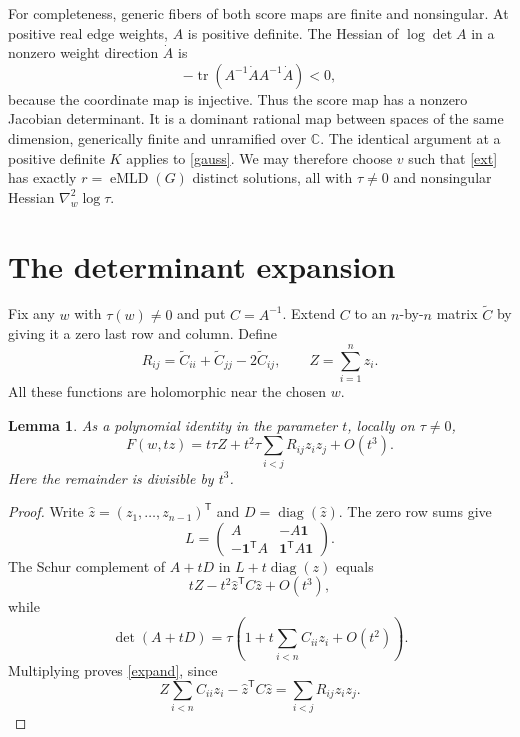 \documentclass[11pt]{article}
\newtheorem{lemma}{Lemma}
\newcommand{\CC}{\mathbb C}
\newcommand{\diag}{\operatorname{diag}}
\newcommand{\eMLD}{\operatorname{eMLD}}
\begin{document}
For completeness, generic fibers of both score maps are finite and
nonsingular. At positive real edge weights, $A$ is positive definite.
The Hessian of $\log\det A$ in a nonzero weight direction $\dot A$ is
\[
 -\operatorname{tr}(A^{-1}\dot A A^{-1}\dot A)<0,
\]
because the coordinate map is injective. Thus the score map has a
nonzero Jacobian determinant. It is a dominant rational map between
spaces of the same dimension, generically finite and unramified over
$\CC$. The identical argument at a positive definite $K$ applies to
\eqref{gauss}. We may therefore choose $v$ such that \eqref{ext} has
exactly $r=\eMLD(G)$ distinct solutions, all with $\tau\ne0$ and
nonsingular Hessian $\nabla_w^2\log\tau$.

\section*{The determinant expansion}
Fix any $w$ with $\tau(w)\ne0$ and put $C=A^{-1}$. Extend $C$ to an
$n$-by-$n$ matrix $\widetilde C$ by giving it a zero last row and column.
Define
\begin{equation}\label{resistance}
 R_{ij}=\widetilde C_{ii}+\widetilde C_{jj}-2\widetilde C_{ij},
 \qquad Z=\sum_{i=1}^n z_i.
\end{equation}
All these functions are holomorphic near the chosen $w$.
\begin{lemma}\label{expansion}
As a polynomial identity in the parameter $t$, locally on $\tau\ne0$,
\begin{equation}\label{expand}
 F(w,tz)=t\tau Z+
 t^2\tau\sum_{i<j}R_{ij}z_i z_j+O(t^3).
\end{equation}
Here the remainder is divisible by $t^3$.
\end{lemma}
\begin{proof}
Write $\widehat z=(z_1,\ldots,z_{n-1})^{\mathsf T}$ and
$D=\diag(\widehat z)$. The zero row sums give
\[
 L=\begin{pmatrix}A&-A\mathbf1\\-\mathbf1^{\mathsf T}A&
                  \mathbf1^{\mathsf T}A\mathbf1\end{pmatrix}.
\]
The Schur complement of $A+tD$ in $L+t\diag(z)$ equals
\[
 tZ-t^2\widehat z^{\mathsf T}C\widehat z+O(t^3),
\]
while
\[
 \det(A+tD)=\tau\left(1+t\sum_{i<n}C_{ii}z_i+O(t^2)\right).
\]
Multiplying proves \eqref{expand}, since
\[
 Z\sum_{i<n}C_{ii}z_i-\widehat z^{\mathsf T}C\widehat z
     =\sum_{i<j}R_{ij}z_i z_j.
\]
\end{proof}
\end{document}
